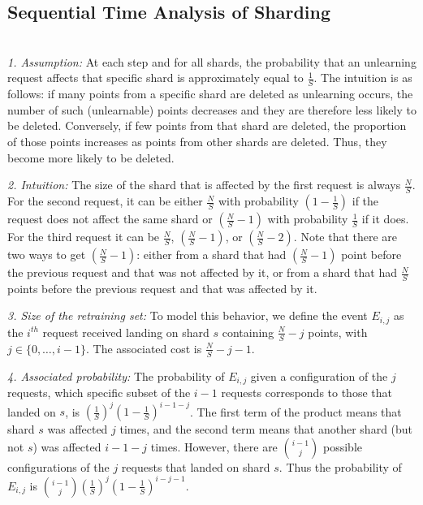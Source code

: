 \subsection{Sequential Time Analysis of Sharding}
\label{appendix:time_sharding_sequential}

 \\
\noindent\emph{1. Assumption:} At each step and for all shards, the probability that an unlearning request affects that specific shard is approximately equal to $\frac{1}{S}$. The intuition is as follows: if many points from a specific shard are deleted as unlearning occurs, the number of such (unlearnable) points decreases and they are therefore less likely to be deleted. Conversely, if few points from that shard are deleted, the proportion of those points increases as points from other shards are deleted. Thus, they become more likely to be deleted. 

\noindent\emph{2. Intuition:} The size of the shard that is affected by the first request is always $\frac{N}{S}$. For the second request, it can be either $\frac{N}{S}$ with probability $\left(1 - \frac{1}{S}\right)$ if the request does not affect the same shard or $\left(\frac{N}{S} - 1\right)$ with probability $\frac{1}{S}$ if it does. For the third request it can be $\frac{N}{S}$, $\left(\frac{N}{S} - 1\right)$, or $\left(\frac{N}{S} - 2\right)$. Note that there are two ways to get $\left(\frac{N}{S} - 1\right)$: either from a shard that had $\left(\frac{N}{S} - 1\right)$ point before the previous request and that was not affected by it, or from a shard that had $\frac{N}{S}$ points before the previous request and that was affected by it.

\noindent\emph{3. Size of the retraining set:} To model this behavior, we define the event $E_{i,j}$ as
the $i^{th}$ request received landing on shard $s$ containing $\frac{N}{S} - j$ points, with $j \in \{0,\dots,i - 1\}$. The associated cost is $\frac{N}{S} - j - 1$.

\noindent\emph{4. Associated probability:} The probability of $E_{i,j}$ given a configuration of the $j$ requests, \ie which specific subset of the $i-1$ requests corresponds to those that landed on $s$, is $\left(\frac{1}{S}\right)^j\left(1 - \frac{1}{S}\right)^{i-1-j}$. The first term of the product means that shard $s$ was affected $j$ times, and the second term means that another shard (but not $s$) was affected $i - 1 - j$ times. However, there are ${i - 1 \choose j}$ possible configurations of the $j$ requests that landed on shard $s$. Thus the probability of $E_{i,j}$ is ${i-1 \choose j}\left(\frac{1}{S}\right)^j\left(1-\frac{1}{S}\right)^{i-j-1}$.


